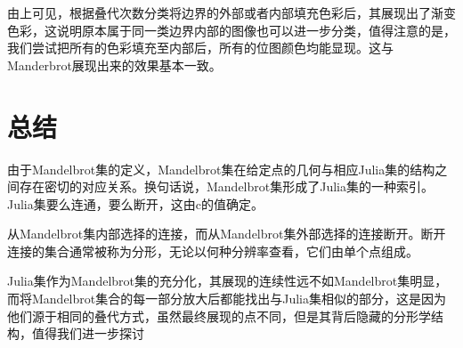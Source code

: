 \documentclass{ctexart}
\begin{document}
由上可见，根据叠代次数分类将边界的外部或者内部填充色彩后，其展现出了渐变色彩，这说明原本属于同一类边界内部的图像也可以进一步分类，值得注意的是，我们尝试把所有的色彩填充至内部后，所有的位图颜色均能显现。这与Manderbrot展现出来的效果基本一致。
\section{总结}

由于Mandelbrot集的定义，Mandelbrot集在给定点的几何与相应Julia集的结构之间存在密切的对应关系。换句话说，Mandelbrot集形成了Julia集的一种索引。Julia集要么连通，要么断开，这由c的值确定。


从Mandelbrot集内部选择的连接，而从Mandelbrot集外部选择的连接断开。断开连接的集合通常被称为分形，无论以何种分辨率查看，它们由单个点组成。\cite{ref5}

Julia集作为Mandelbrot集的充分化，其展现的连续性远不如Mandelbrot集明显，而将Mandelbrot集合的每一部分放大后都能找出与Julia集相似的部分，这是因为他们源于相同的叠代方式，虽然最终展现的点不同，但是其背后隐藏的分形学结构，值得我们进一步探讨\cite{ref6}




\end{document}
